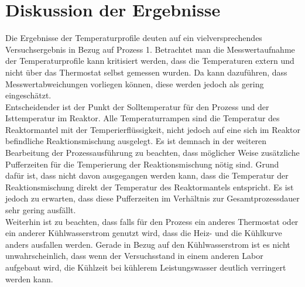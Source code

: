 \section{Diskussion der Ergebnisse}
\label{sec:diskussion}

Die Ergebnisse der Temperaturprofile deuten auf ein vielversprechendes Versuchsergebnis in Bezug auf Prozess 1. Betrachtet man die Messwertaufnahme der Temperaturprofile kann kritisiert werden, dass die Temperaturen extern und nicht über das Thermostat selbst gemessen wurden. Da kann dazuführen, dass Messwertabweichungen vorliegen können, diese werden jedoch als gering eingeschätzt.\\
Entscheidender ist der Punkt der Solltemperatur für den Prozess und der Isttemperatur im Reaktor. Alle Temperaturrampen sind die Temperatur des Reaktormantel mit der Temperierflüssigkeit, nicht jedoch auf eine sich im Reaktor befindliche Reaktionsmischung ausgelegt. Es ist demnach in der weiteren Bearbeitung der Prozessausführung zu beachten, dass möglicher Weise zusätzliche Pufferzeiten für die Temperierung der Reaktionsmischung nötig sind. Grund dafür ist, dass nicht davon ausgegangen werden kann, dass die Temperatur der Reaktionsmischung direkt der Temperatur des Reaktormantels entspricht. Es ist jedoch zu erwarten, dass diese Pufferzeiten im Verhältnis zur Gesamtprozessdauer sehr gering ausfällt.\\
Weiterhin ist zu beachten, dass falls für den Prozess ein anderes Thermostat oder ein anderer Kühlwasserstrom genutzt wird, dass die Heiz- und die Kühlkurve anders ausfallen werden. Gerade in Bezug auf den Kühlwasserstrom ist es nicht unwahrscheinlich, dass wenn der Versuchsstand in einem anderen Labor aufgebaut wird, die Kühlzeit bei kühlerem Leistungswasser deutlich verringert werden kann.\\

